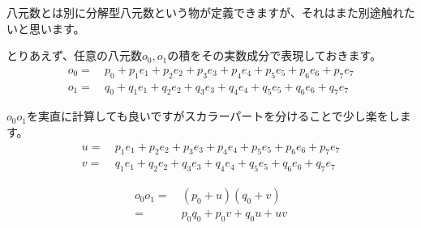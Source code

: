 \documentclass[a4paper,12pt]{jsreport}
\begin{document}
八元数とは別に分解型八元数という物が定義できますが、それはまた別途触れたいと思います。

とりあえず、任意の八元数$o_0,o_1$の積をその実数成分で表現しておきます。
\begin{equation}
\begin{split}
o_0=~&p_0+p_1e_1+p_2e_2+p_3e_3+p_4e_4+p_5e_5+p_6e_6+p_7e_7\\
o_1=~&q_0+q_1e_1+q_2e_2+q_3e_3+q_4e_4+q_5e_5+q_6e_6+q_7e_7
\end{split}
\end{equation}

$o_0o_1$を実直に計算しても良いですがスカラーパートを分けることで少し楽をします。
\begin{equation}
\begin{split}
u=~&p_1e_1+p_2e_2+p_3e_3+p_4e_4+p_5e_5+p_6e_6+p_7e_7\\
v=~&q_1e_1+q_2e_2+q_3e_3+q_4e_4+q_5e_5+q_6e_6+q_7e_7
\end{split}
\end{equation}

\begin{equation}
\begin{split}
o_0o_1=~&(p_0+u)(q_0+v)\\
=~&p_0q_0+p_0v+q_0u+uv
\end{split}
\end{equation}
\end{document}
